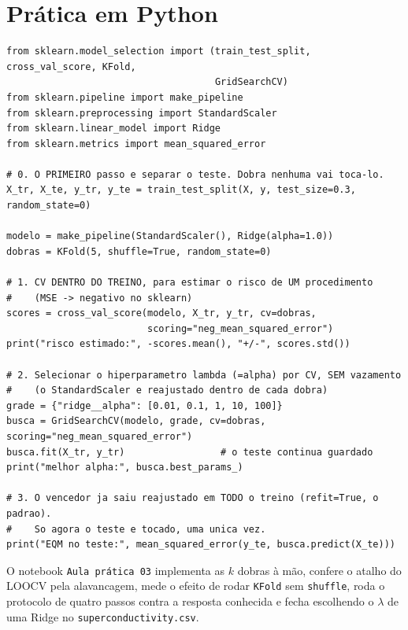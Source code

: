 \documentclass[11pt,a4paper]{article}
\begin{document}
\section{Prática em Python}
\begin{lstlisting}
from sklearn.model_selection import (train_test_split, cross_val_score, KFold,
                                     GridSearchCV)
from sklearn.pipeline import make_pipeline
from sklearn.preprocessing import StandardScaler
from sklearn.linear_model import Ridge
from sklearn.metrics import mean_squared_error

# 0. O PRIMEIRO passo e separar o teste. Dobra nenhuma vai toca-lo.
X_tr, X_te, y_tr, y_te = train_test_split(X, y, test_size=0.3, random_state=0)

modelo = make_pipeline(StandardScaler(), Ridge(alpha=1.0))
dobras = KFold(5, shuffle=True, random_state=0)

# 1. CV DENTRO DO TREINO, para estimar o risco de UM procedimento
#    (MSE -> negativo no sklearn)
scores = cross_val_score(modelo, X_tr, y_tr, cv=dobras,
                         scoring="neg_mean_squared_error")
print("risco estimado:", -scores.mean(), "+/-", scores.std())

# 2. Selecionar o hiperparametro lambda (=alpha) por CV, SEM vazamento
#    (o StandardScaler e reajustado dentro de cada dobra)
grade = {"ridge__alpha": [0.01, 0.1, 1, 10, 100]}
busca = GridSearchCV(modelo, grade, cv=dobras, scoring="neg_mean_squared_error")
busca.fit(X_tr, y_tr)                 # o teste continua guardado
print("melhor alpha:", busca.best_params_)

# 3. O vencedor ja saiu reajustado em TODO o treino (refit=True, o padrao).
#    So agora o teste e tocado, uma unica vez.
print("EQM no teste:", mean_squared_error(y_te, busca.predict(X_te)))
\end{lstlisting}

O notebook \texttt{Aula prática 03} implementa as $k$ dobras à mão, confere o atalho
do LOOCV pela alavancagem, mede o efeito de rodar \texttt{KFold} sem
\texttt{shuffle}, roda o protocolo de quatro passos contra a resposta conhecida e
fecha escolhendo o $\lambda$ de uma Ridge no \texttt{superconductivity.csv}.

\end{document}
